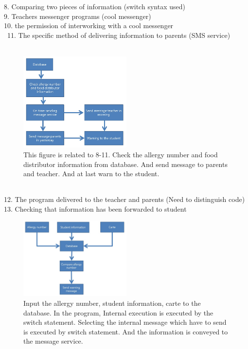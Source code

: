 \documentclass[a4paper,11pt]{IEEEtran}
\begin{document}
{8. Comparing two pieces of information (switch syntax used)\\
9. Teachers messenger programs (cool messenger)\\
10. the permission of interworking with a cool messenger   \\\
11. The specific method of delivering information to parents (SMS service)\\
~\\
\begin{figure}[!h]
        \centering
        \includegraphics[width=0.5\textwidth, height=0.55\textheight]{s2.jpg}
        \caption{This figure is related to 8-11. Check the allergy number and food distributor information from database. And send message to parents and teacher. And at last warn to the student. }
        \label{fig1}
\end{figure}    
~\\
12. The program delivered to the teacher and parents (Need to distinguish code)\\
13. Checking that information has been forwarded to student\\
\clearpage
\begin{figure}[!h]
        \centering
        \includegraphics[width=0.5\textwidth, height=0.5\textheight]{s3.jpg}
        \caption{Input the allergy number, student information, carte to the database. In the program, Internal execution is executed by the switch statement. Selecting the internal message which have to send is executed by switch statement. And the information is conveyed to the message service.}

\end{figure}}
\end{document}
